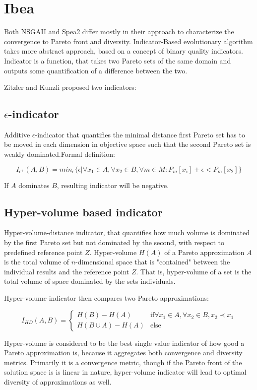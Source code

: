 \documentclass[12pt,oneside]{fithesis2}
\begin{document}
\section{Ibea}
Both NSGAII and Spea2 differ mostly in their approach to characterize the convergence to Pareto front and diversity. 
Indicator-Based evolutionary algorithm\cite{zitzler2004indicator} takes more abstract approach, based on a concept of binary quality indicators.
Indicator is a function, that takes two Pareto sets of the same domain and outputs some quantification of a difference between the two.

Zitzler and Kunzli proposed two indicators:


\subsection{$\epsilon$-indicator}   
Additive $\epsilon$-indicator that quantifies the minimal distance first Pareto set has to be moved in each dimension in objective space such that the second Pareto set is weakly dominated.Formal definition:

$$I_{\epsilon^+}(A,B) = min_\epsilon\{\epsilon |\forall x_1 \in A, \forall x_2 \in B, \forall m \in M: P_m[x_i] + \epsilon < P_m[x_2] \} $$

If $A$ dominates $B$, resulting indicator will be negative.

\subsection{Hyper-volume based indicator}   
Hyper-volume-distance indicator, that quantifies how much volume is dominated by the first Pareto set but not dominated by the second, with respect to predefined reference point $Z$. 
Hyper-volume $H(A)$ of a Pareto approximation $A$ is the total volume of $n$-dimensional space that is "contained" between the individual results and the reference point $Z$. That is, hyper-volume of a set is the total volume of space dominated by the sets individuals.

Hyper-volume indicator then compares two Pareto approximations:

$$I_{HD}(A,B) = 
\begin{cases} 
    H(B) - H(A) & \text{if} \forall x_1 \in A, \forall x_2 \in B, x_2 \prec x_1 \\
    H(B \cup A) - H(A) & \text{else}
\end{cases}$$

Hyper-volume is considered to be the best single value indicator of how good a Pareto approximation is, because it aggregates both convergence and diversity metrics. Primarily it is a convergence metric, though if the Pareto front of the solution space is is linear in nature, hyper-volume indicator will lead to optimal diversity of approximations as well. \cite{auger2009theory} 
\end{document}
